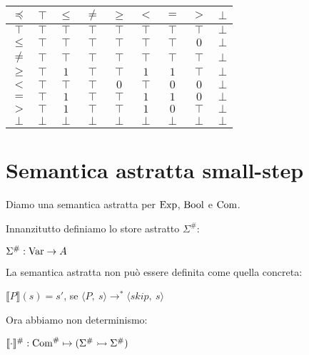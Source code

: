 \begin{center}
	\begin{tabular}{| c | c | c | c | c | c | c | c | c | }
		\hline
		$\preceq$ & $\top$ & $\leq$ & $\neq$ & $\geq$ & $<$ & $=$ & $>$ & $\bot$ \\
		\hline
		$\top$ & $\top$ & $\top$ & $\top$ & $\top$ & $\top$ & $\top$ & $\top$ & $\bot$\\
		\hline
		$\leq$ & $\top$ & $\top$ & $\top$ & $\top$ & $\top$ & $\top$ & $0$ & $\bot$\\
		\hline
		$\neq$ & $\top$ & $\top$ & $\top$ & $\top$ & $\top$ & $\top$ & $\top$ & $\bot$\\
		\hline
		$\geq$ & $\top$ & $1$ & $\top$ & $\top$ & $1$ & $1$ & $\top$ & $\bot$ \\
		\hline
		$<$ & $\top$ & $\top$ & $\top$ & $0$ & $\top$ & $0$ & $0$ & $\bot$\\
		\hline
		$=$ & $\top$ & $1$ & $\top$ & $\top$ & $1$ & $1$ & $0$ & $\bot$ \\
		\hline
		$>$ & $\top$ & $1$ & $\top$ & $\top$ & $1$ & $0$ & $\top$ & $\bot$ \\
		\hline
		$\bot$ & $\bot$ & $\bot$ & $\bot$ & $\bot$ & $\bot$ & $\bot$ & $\bot$ & $\bot$\\
		\hline
	\end{tabular}
\end{center}

\section{Semantica astratta small-step}

Diamo una semantica astratta per $\mathrm{Exp}$, $\mathrm{Bool}$ e $\mathrm{Com}$.

Innanzitutto definiamo lo store astratto $\Sigma^\#:$

\begin{center}
	$ \Sigma^\# : \mathrm{Var} \rightarrow A $
\end{center}

La semantica astratta non può essere definita come quella concreta:
\begin{center}
	$ \llbracket P \rrbracket (s) = s' $, se $ \langle P,\ s \rangle \rightarrow^* \langle skip,\ s \rangle $
\end{center}

Ora abbiamo non determinismo:
\begin{center}
	$ \llbracket \cdot \rrbracket^\# : \mathrm{Com}^\# \mapsto (\Sigma^\# \rightarrowtail \Sigma^\#) $
\end{center}

